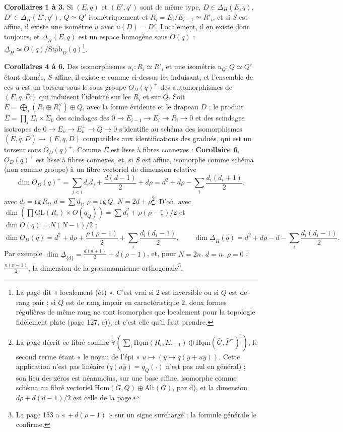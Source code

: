 \documentclass[11pt,a4paper]{article}
\begin{document}
\textbf{Corollaires 1 à 3.} Si $(E, q)$ et $(E', q')$ sont de même type, $D \in
\Delta_H(E, q)$, $D' \in \Delta_H(E', q')$, $Q \simeq Q'$ isométriquement et $R_i =
E_i/E_{i-1} \simeq R'_i$, et si $S$ est affine, il existe une isométrie $u$ avec $u(D) =
D'$. Localement, il en existe donc toujours, et $\underline{\Delta}_H(E, q)$ est un
espace homogène sous $O(q)$ : $\underline{\Delta}_H \simeq
O(q)/\underline{\mathrm{Stab}}_D(q)$\footnote{La page dit « localement (ét) ». C'est vrai
si $2$ est inversible ou si $Q$ est de rang pair ; si $Q$ est de rang impair en
caractéristique $2$, deux formes régulières de même rang ne sont isomorphes que
localement pour la topologie fidèlement plate (page 127, e)), et c'est elle qu'il faut
prendre.}.

\textbf{Corollaires 4 à 6.} Des isomorphismes $u_i : R_i \simeq R'_i$ et une isométrie
$u_Q : Q \simeq Q'$ étant donnés, $S$ affine, il existe $u$ comme ci-dessus les
induisant, et l'ensemble de ces $u$ est un torseur sous le sous-groupe $O_D(q)^{+}$ des
automorphismes de $(E, q, D)$ qui induisent l'identité sur les $R_i$ et sur $Q$. Soit
$\bar{E} = \bigoplus_i (R_i \oplus R_i^{\vee}) \oplus Q$, avec la forme évidente et le
drapeau $\bar{D}$ ; le produit $\bar{\Sigma} = \prod_i \Sigma_i \times \Sigma_0$ des
scindages des $0 \to E_{i-1} \to E_i \to R_i \to 0$ et des scindages isotropes de $0 \to
E_\nu \to E_\nu^{\perp} \to Q \to 0$ s'identifie au schéma des isomorphismes
$(\bar{E}, \bar{q}, \bar{D}) \to (E, q, D)$ compatibles aux identifications des
gradués, qui est un torseur sous $O_D(q)^{+}$. Comme $\bar{\Sigma}$ est lisse à fibres
connexes : \textbf{Corollaire 6}, $O_D(q)^{+}$ est lisse à fibres connexes, et, si $S$
est affine, isomorphe comme schéma (non comme groupe) à un fibré vectoriel de
dimension relative
\[
  \dim O_D(q)^{+} = \sum_{j < i} d_id_j + \frac{d(d-1)}{2} + d\rho = d^2 + d\rho -
  \sum_i \frac{d_i(d_i+1)}{2},
\]
avec $d_i = \mathrm{rg}\,R_i$, $d = \sum d_i$, $\rho = \mathrm{rg}\,Q$, $N = 2d +
\rho$\footnote{La page décrit ce fibré comme $\check{\mathbb{V}}(\sum_i
\underline{\mathrm{Hom}}(R_i, E_{i-1}) \oplus \underline{\mathrm{Hom}}(\bar{G},
\bar{F}^{\perp})^{!})$, le second terme étant « le noyau de l'épi » $u \mapsto (\bar{y}
\mapsto \bar{q}(\bar{y} + u\bar{y}))$. Cette application n'est pas linéaire ($q(u\bar{y})
= q_Q(\cdot)$ n'est pas nul en général) ; son lieu des zéros est néanmoins, sur une base
affine, isomorphe comme schéma au fibré vectoriel $\mathrm{Hom}(G, Q) \oplus
\mathrm{Alt}(G)$, par d), et la dimension $d\rho + d(d-1)/2$ est celle de la page.}.
D'où, avec $\dim(\prod \mathrm{GL}(R_i) \times O(q_Q)) = \sum d_i^2 + \rho(\rho -
1)/2$ et $\dim O(q) = N(N-1)/2$ :
\[
  \dim O_D(q) = d^2 + d\rho + \frac{\rho(\rho - 1)}{2} + \sum_i \frac{d_i(d_i - 1)}{2},
  \qquad
  \dim \underline{\Delta}_H(q) = d^2 + d\rho - d - \sum_i \frac{d_i(d_i - 1)}{2}.
\]
Par exemple $\dim \underline{\Delta}_{\{d\}} = \frac{d(d+1)}{2} + d(\rho - 1)$, et, pour $N
= 2n$, $d = n$, $\rho = 0$ : $\frac{n(n-1)}{2}$, la dimension de la grassmannienne
orthogonale\footnote{La page 153 a « $+\,d(\rho - 1)$ » sur un signe surchargé ; la
formule générale le confirme.}.
\end{document}
